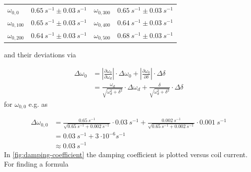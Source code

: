             \begin{table}[h]
                \centering
                \caption[Angular natural frequencies]{}
                \begin{tabular}{@{}llll@{}}
                    \toprule
                    $\omega_{0,0}$      &$\SI{0.65}{s^{-1}} \pm \SI{0.03}{s^{-1}}$  &\hspace{10mm}$\omega_{0,300}$   &$\SI{0.65}{s^{-1}} \pm \SI{0.03}{s^{-1}}$\\
                    $\omega_{0,100}$    &$\SI{0.65}{s^{-1}} \pm \SI{0.03}{s^{-1}}$  &\hspace{10mm}$\omega_{0,400}$   &$\SI{0.64}{s^{-1}} \pm \SI{0.03}{s^{-1}}$\\
                    $\omega_{0,200}$    &$\SI{0.64}{s^{-1}} \pm \SI{0.03}{s^{-1}}$  &\hspace{10mm}$\omega_{0,500}$   &$\SI{0.68}{s^{-1}} \pm \SI{0.03}{s^{-1}}$\\
                    \bottomrule
                \end{tabular}
                \label{tab:angular_natural_frequencies}
            \end{table}
            and their deviations via\par
            \begin{align}
                \Delta\omega_0  &=\left| \frac{\partial\omega_0}{\partial\omega_d} \right| \cdot \Delta\omega_0 + \left| \frac{\partial\omega_0}{\partial\delta} \right| \cdot \Delta\delta \nonumber\\
                                &=\frac{\omega_d}{\sqrt{\omega_d^2+\delta^2}} \cdot \Delta\omega_d + \frac{\delta}{\sqrt{\omega_d^2+\delta^2}} \cdot \Delta\delta
            \end{align}
            for \(\omega_{0,0}\) e.g. as\par
            \begin{align*}
                \Delta\omega_{0,0}  &=\frac{\SI{0.65}{s^{-1}}}{\sqrt{\SI{0.65}{s^{-1}}+\SI{0.002}{s^{-1}}}} \cdot \SI{0.03}{s^{-1}} + \frac{\SI{0.002}{s^{-1}}}{\sqrt{\SI{0.65}{s^{-1}}+\SI{0.002}{s^{-1}}}} \cdot \SI{0.001}{s^{-1}}\\
                                    &=\SI{0.03}{s^{-1}}+\SI{3}{\cdot10^{-6}s^{-1}}\\
                                    &\approx\SI{0.03}{s^{-1}}
            \end{align*}
            In \cref{fig:damping-coefficient} the damping coefficient is plotted versus coil current. For finding a formula

